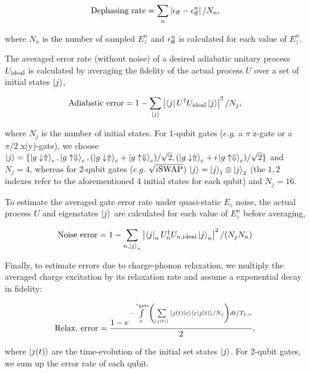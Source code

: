 \documentclass[aps,prb,superscriptaddress,nobibnotes,twocolumn]{revtex4-1}
\begin{document}
{\begin{equation}
{\rm Dephasing~rate}=\sum\limits_{n}{\left|\epsilon_{\rm ff}-\epsilon_{\rm ff}^n\right|/N_n},
\end{equation}

where $N_n$ is the number of sampled $E_z^n$ and $\epsilon_{\rm ff}^n$ is calculated for each value of $E_z^n$. 

The averaged error rate (without noise) of a desired adiabatic unitary process $U_{\rm ideal}$ is calculated by averaging the fidelity of the actual process $U$ over a set of initial states $\ket{j}$,

\begin{equation}
{\rm Adiabatic~error}=1-\sum\limits_{\ket{j}}{\left|\bra{j}U^\dagger U_{\rm ideal}\ket{j}\right|^2/N_j},
\end{equation}

where $N_j$ is the number of initial states. For 1-qubit gates ($e.g.$ a $\pi$ z-gate or a $\pi/2$ x(y)-gate), we choose $\ket{j}=\{\ket{g\downarrow\Uparrow}_e,\ket{g\uparrow\Downarrow}_e,(\ket{g\downarrow\Uparrow}_e+\ket{g\uparrow\Downarrow}_e)/\sqrt{2},(\ket{g\downarrow\Uparrow}_e+i\ket{g\uparrow\Downarrow}_e)/\sqrt{2}\}$ and $N_j=4$, whereas for 2-qubit gates ($e.g.$ $\sqrt{i{\rm SWAP}}$) $\ket{j}=\ket{j}_1\otimes\ket{j}_2$ (the ${1,2}$ indexes refer to the aforementioned 4 initial states for each qubit) and $N_j=16$.

To estimate the averaged gate error rate under quasi-static $E_z$ noise, the actual process $U$ and eigenstates $\ket{j}$ are calculated for each value of $E_z^n$ before averaging,

\begin{equation}
{\rm Noise~error}=1-\sum\limits_{n,\ket{j}_n}{\left|\bra{j}_nU_n^\dagger U_{n,\rm ideal}\ket{j}_n\right|^2/(N_jN_n)}
\end{equation}

Finally, to estimate errors due to charge-phonon relaxation, we multiply the averaged charge excitation by its relaxation rate and assume a exponential decay in fidelity:

\begin{equation}
{\rm Relax.~error}=\frac{1-e^{-\int\limits_{0}^{\tau_{\rm gate}}\left({\sum\limits_{\ket{j(t)}}{\braket{j(t)|e}\braket{e|j(t)}/N_j
}}\right)dt/T_{1, \rm o}}}{2},
\end{equation}

where $\ket{j(t)}$ are the time-evolution of the initial set states $\ket{j}$. For 2-qubit gates, we sum up the error rate of each qubit.
}
\end{document}

